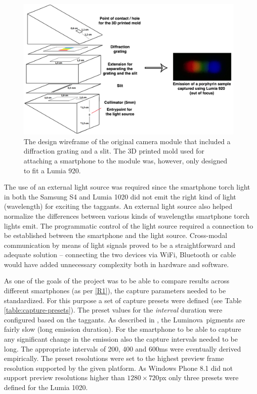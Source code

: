 \documentclass[thesis.tex]{subfiles}
\begin{document}
\begin{figure}[h!]
  \centering \includegraphics[page=1,width=\textwidth]{images/findings/original_camera_module}
  \caption{The design wireframe of the original camera module that included a diffraction grating and a slit. The 3D printed mold used for attaching a smartphone to the module was, however, only designed to fit a Lumia 920.}
  \label{figure:origina-camera-module}
\end{figure}

The use of an external light source was required since the smartphone torch light in both the Samsung S4 and Lumia 1020 did not emit the right kind of light (wavelength) for exciting the taggants. An external light source also helped normalize the differences between various kinds of wavelengths smartphone torch lights emit. The programmatic control of the light source required a connection to be established between the smartphone and the light source. Cross-modal communication by means of light signals proved to be a straightforward and adequate solution -- connecting the two devices via WiFi, Bluetooth or cable would have added unnecessary complexity both in hardware and software.

As one of the goals of the project was to be able to compare results across different smartphones (as per \ref{R1}), the capture parameters needed to be standardized. For this purpose a set of capture presets were defined (see Table \ref{table:capture-presets}). The preset values for the \emph{interval} duration were configured based on the taggants. As described in \cite{luminova}, the Luminova\textregistered\ pigments are fairly slow (long emission duration). For the smartphone to be able to capture any significant change in the emission also the capture intervals needed to be long. The appropriate intervals of 200, 400 and 600ms were eventually derived empirically. The preset resolutions were set to the highest preview frame resolution supported by the given platform. As Windows Phone 8.1 did not support preview resolutions higher than $1280\times720$px only three presets were defined for the Lumia 1020.
\end{document}
